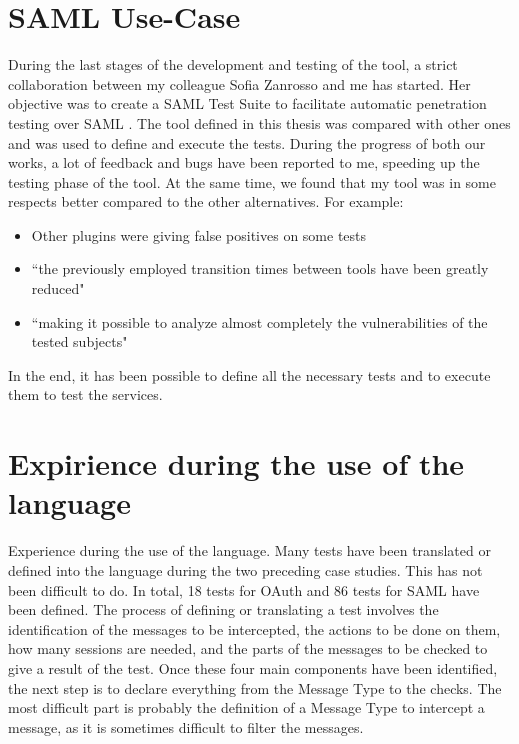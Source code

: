 \section{SAML Use-Case}
During the last stages of the development and testing of the tool, a strict collaboration between my colleague Sofia Zanrosso and me has started. Her objective was to create a \gls{SAML} Test Suite to facilitate automatic penetration testing over \gls{SAML} \cite{sofia_zanrosso}. The tool defined in this thesis was compared with other ones and was used to define and execute the tests. During the progress of both our works, a lot of feedback and bugs have been reported to me, speeding up the testing phase of the tool. At the same time, we found that my tool was in some respects better compared to the other alternatives. For example:
\begin{itemize}
    \item Other plugins were giving false positives on some tests
    \item ``the previously employed transition times between tools have been greatly reduced"
    \item ``making it possible to analyze almost completely the vulnerabilities of the tested subjects"
\end{itemize}
In the end, it has been possible to define all the necessary tests and to execute them to test the services.

\section{Expirience during the use of the language}
Experience during the use of the language.
Many tests have been translated or defined into the language during the two preceding case studies. This has not been difficult to do. In total, 18 tests for OAuth and 86 tests for SAML have been defined. The process of defining or translating a test involves the identification of the messages to be intercepted, the actions to be done on them, how many sessions are needed, and the parts of the messages to be checked to give a result of the test. Once these four main components have been identified, the next step is to declare everything from the Message Type to the checks. The most difficult part is probably the definition of a Message Type to intercept a message, as it is sometimes difficult to filter the messages.





